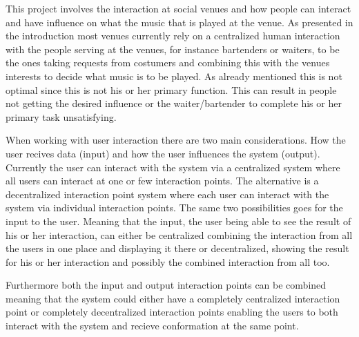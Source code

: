This project involves the interaction at social venues and how people can interact and have influence on what the music that is played at the venue. As presented in the introduction most venues currently rely on a centralized human interaction with the people serving at the venues, for instance bartenders or waiters, to be the ones taking requests from costumers and combining this with the venues interests to decide what music is to be played. As already mentioned this is not optimal since this is not his or her primary function. This can result in people not getting the desired influence or the waiter/bartender to complete his or her primary task unsatisfying.

When working with user interaction there are two main considerations. How the user recives data (input) and how the user influences the system (output).
Currently the user can interact with the system via a centralized system where all users can interact at one or few interaction points. The alternative is a decentralized interaction point system where each user can interact with the system via individual interaction points.
The same two possibilities goes for the input to the user. Meaning that the input, the user being able to see the result of his or her interaction, can either be centralized combining the interaction from all the users in one place and displaying it there or decentralized, showing the result for his or her interaction and possibly the combined interaction from all too.

Furthermore both the input and output interaction points can be combined meaning that the system could either have a completely centralized interaction point or completely decentralized interaction points enabling the users to both interact with the system and recieve conformation at the same point.

